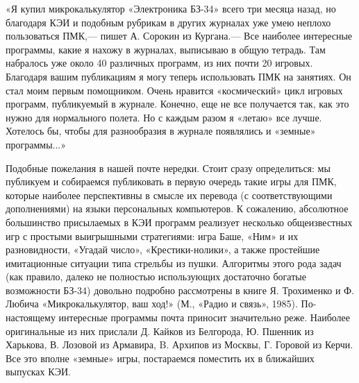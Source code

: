 \documentclass[11pt,a4paper,oneside]{article}
\begin{document}
«Я купил микрокалькулятор «Электроника БЗ-34» всего три месяца назад, но благодаря КЭИ и подобным рубрикам в других журналах уже умею неплохо пользоваться ПМК,— пишет А.	Сорокин из Кургана.— Все наиболее интересные программы, какие я нахожу в журналах, выписываю в общую тетрадь. Там набралось уже около 40 различных программ, из них почти 20 игровых. Благодаря вашим публикациям я могу теперь использовать ПМК на занятиях. Он стал моим первым помощником. Очень нравится «космический» цикл игровых программ, публикуемый в журнале. Конечно, еще не все получается так, как это нужно для нормального полета. Но с каждым разом я «летаю» все лучше. Хотелось бы, чтобы для разнообразия в журнале появлялись и «земные» программы...»

Подобные пожелания в нашей почте нередки. Стоит сразу определиться: мы публикуем и собираемся публиковать в первую очередь такие игры для ПМК, которые наиболее перспективны в смысле их перевода (с соответствующими дополнениями) на языки персональных компьютеров. К сожалению, абсолютное большинство присылаемых в КЭИ программ реализует несколько общеизвестных игр с простыми выигрышными стратегиями: игра Баше, «Ним» и их разновидности, «Угадай число», «Крестики-нолики», а также простейшие имитационные ситуации типа стрельбы из пушки. Алгоритмы этого рода задач (как правило, далеко не полностью использующих достаточно богатые возможности БЗ-34) довольно подробно рассмотрены в книге Я. Трохименко и Ф. Любича «Микрокалькулятор, ваш ход!» (М., «Радио и связь», 1985). По-настоящему интересные программы почта приносит значительно реже. Наиболее оригинальные из них прислали Д. Кайков из Белгорода, Ю. Пшенник из Харькова, В. Лозовой из Армавира,
B. 	Архипов из Москвы, Г. Горовой из Керчи. Все это вполне «земные» игры, постараемся поместить их в ближайших выпусках КЭИ.
\end{document}
